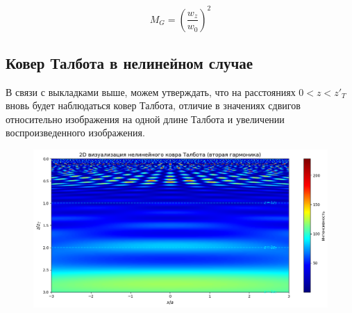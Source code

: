 \begin{equation}
M_G = \left(\frac{w_z}{w_0}\right)^2
\end{equation}


\subsection{Ковер Талбота в нелинейном случае}
В связи с выкладками выше, можем утверждать, что на расстояниях $0 < z < z'_T$ вновь будет наблюдаться ковер Талбота, отличие в значениях сдвигов относительно изображения на одной длине Талбота и увеличении воспроизведенного изображения.\\

\begin{figure}[H]
    \centering
    \includegraphics[width=1\linewidth]{images/sh.png}
    \label{sh}
\end{figure}













